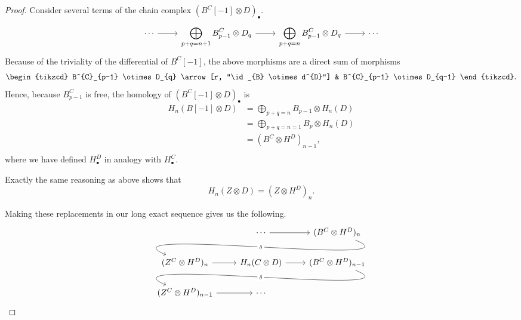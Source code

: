 \documentclass[main.tex]{subfiles}
\begin{document}
\begin{proof}
  Consider several terms of the chain complex $(B^{C}[-1] \otimes D)_{\bullet}$.
  \begin{equation*}
    \begin{tikzcd}
      \cdots
      \arrow[r]
      & \displaystyle\bigoplus\limits_{p+q=n+1} B^{C}_{p-1} \otimes D_{q}
      \arrow[r]
      & \displaystyle\bigoplus\limits_{p+q=n} B^{C}_{p-1} \otimes D_{q}
      \arrow[r]
      & \cdots
    \end{tikzcd}
  \end{equation*}
  Because of the triviality of the differential of $B^{C}[-1]$, the above morphisms are a direct sum of morphisms
  \begin{equation*}
    \begin{tikzcd}
      B^{C}_{p-1} \otimes D_{q} 
      \arrow[r, "\id_{B} \otimes d^{D}"]
      & B^{C}_{p-1} \otimes D_{q-1} 
    \end{tikzcd}.
  \end{equation*}
  Hence, because $B^{C}_{p-1}$ is free, the homology of $(B^{C}[-1] \otimes D)_{\bullet}$ is
  \begin{align*}
    H_{n}(B[-1] \otimes D) &= \bigoplus_{p+q=n} B_{p-1} \otimes H_{n}(D) \\
    &= \bigoplus_{p+q=n=1} B_{p} \otimes H_{n}(D) \\
    &= (B^{C} \otimes H^{D})_{n-1}, \\
  \end{align*}
  where we have defined $H^{D}_{\bullet}$ in analogy with $H^{C}_{\bullet}$.

  Exactly the same reasoning as above shows that
  \begin{equation*}
    H_{n}(Z \otimes D) = (Z \otimes H^{D})_{n}.
  \end{equation*}

  Making these replacements in our long exact sequence gives us the following.
  \begin{equation*}
    \begin{tikzcd}
      & \cdots
      \arrow[r]
      & (B^{C} \otimes H^{D})_{n}
      \arrow[dll, out=-22, in=157, looseness=1, overlay, "\delta" description]
      \\
      (Z^{C} \otimes H^{D})_{n}
      \arrow[r]
      & H_{n}(C \otimes D)
      \arrow[r]
      & (B^{C} \otimes H^{D})_{n-1}
      \arrow[dll, out=-22, in=157, looseness=1, overlay, "\delta" description]
      \\
      (Z^{C} \otimes H^{D})_{n-1}
      \arrow[r]
      & \cdots
    \end{tikzcd}
  \end{equation*}


\end{proof}
\end{document}
